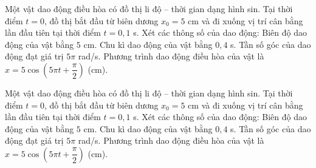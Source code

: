 \begin{ex}
Một vật dao động điều hòa có đồ thị li độ – thời gian dạng hình sin. Tại thời điểm $t = 0$, đồ thị bắt đầu từ biên dương $x_0 = 5$ cm và đi xuống vị trí cân bằng lần đầu tiên tại thời điểm $t = 0,1$ s. Xét các thông số của dao động:
\choiceTF
{\True Biên độ dao động của vật bằng $5$ cm.}
{\True Chu kì dao động của vật bằng $0,4$ s.}
{\True Tần số góc của dao động đạt giá trị $5\pi$ rad/s.}
{Phương trình dao động điều hòa của vật là $x = 5\cos\left(5\pi t + \dfrac{\pi}{2}\right)$ (cm).}
\end{ex}

\begin{ex}
Một vật dao động điều hòa có đồ thị li độ – thời gian dạng hình sin. Tại thời điểm $t = 0$, đồ thị bắt đầu từ biên dương $x_0 = 5$ cm và đi xuống vị trí cân bằng lần đầu tiên tại thời điểm $t = 0,1$ s. Xét các thông số của dao động:
\choiceTF
{\True Biên độ dao động của vật bằng $5$ cm.}
{\True Chu kì dao động của vật bằng $0,4$ s.}
{\True Tần số góc của dao động đạt giá trị $5\pi$ rad/s.}
{Phương trình dao động điều hòa của vật là $x = 5\cos\left(5\pi t + \dfrac{\pi}{2}\right)$ (cm).}
\end{ex}

